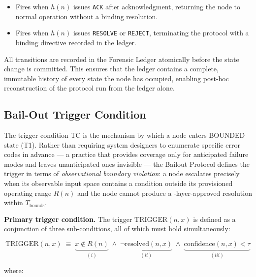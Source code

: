 \begin{itemize}
\item[T8 --- \texttt{HUMAN\_ACKNOWLEDGED $\rightarrow$ IDLE}:] Fires when $h(n)$ issues \texttt{ACK} after acknowledgment, returning the node to normal operation without a binding resolution.

\item[T9 --- \texttt{HUMAN\_ACKNOWLEDGED $\rightarrow$ RESOLVED}:] Fires when $h(n)$ issues \texttt{RESOLVE} or \texttt{REJECT}, terminating the protocol with a binding directive recorded in the ledger.
\end{itemize}

All transitions are recorded in the Forensic Ledger atomically before the state change is committed. This ensures that the ledger contains a complete, immutable history of every state the node has occupied, enabling post-hoc reconstruction of the protocol run from the ledger alone.

\subsection{Bail-Out Trigger Condition}\label{sec:bailout-trigger}

The trigger condition TC is the mechanism by which a node enters BOUNDED state (T1). Rather than requiring system designers to enumerate specific error codes in advance — a practice that provides coverage only for anticipated failure modes and leaves unanticipated ones invisible — the Bailout Protocol defines the trigger in terms of \emph{observational boundary violation}: a node escalates precisely when its observable input space contains a condition outside its provisioned operating range $R(n)$ and the node cannot produce a \fact-layer-approved resolution within $T_{\text{bounds}}$.

\bigskip
\noindent\textbf{Primary trigger condition.} The trigger $\text{TRIGGER}(n, x)$ is defined as a conjunction of three sub-conditions, all of which must hold simultaneously:

\begin{equation}
\text{TRIGGER}(n, x) \;\equiv\; \underbrace{x \notin R(n)}_{(i)} \;\land\; \underbrace{\neg\text{resolved}(n, x)}_{(ii)} \;\land\; \underbrace{\text{confidence}(n, x) < \tau}_{(iii)} \tag{TC}
\end{equation}

where:


